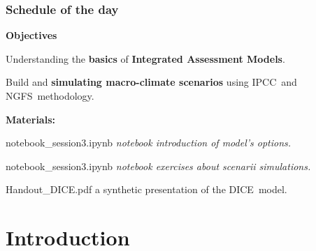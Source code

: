 \documentclass[xcolor=x11names,compress,aspectratio=169]{beamer}%
\makeatletter
\renewenvironment{itemize}{\begin{compactitemize}[<+-| alert@+>]}{\end{compactitemize}}
\makeatother
\begin{document}
\begin{frame}%
%

\frametitle{Schedule of the day}%


\textbf{Objectives}

\begin{itemize}
\item Understanding the \textbf{basics} of \textbf{Integrated Assessment
Models}.

\item Build and \textbf{simulating macro-climate scenarios} using IPCC\ and
NGFS\ methodology.%
\vspace{1ex}%

\end{itemize}

\textbf{Materials:}

\begin{itemize}
\item \textsf{notebook\_session3.ipynb} \textit{notebook introduction
of model's options.}

\item \textsf{notebook\_session3.ipynb} \textit{notebook
exercises about scenarii simulations.}

\item \textsf{Handout\_DICE.pdf} a synthetic presentation of the DICE\ model.
\end{itemize}

%

\transboxout
\end{frame}%


\section{Introduction}%
\end{document}
